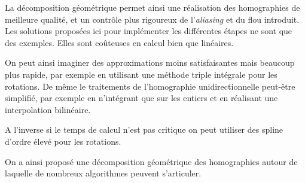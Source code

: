 
La décomposition géométrique permet ainsi une réalisation des homographies de meilleure qualité, et un contrôle plus rigoureux de l'\emph{aliasing} et du flou introduit. Les solutions proposées ici pour implémenter les différentes étapes ne sont que des exemples. Elles sont coûteuses en calcul bien que linéaires. 

On peut ainsi imaginer des approximations moins satisfaisantes mais beaucoup plus rapide, par exemple en utilisant une méthode triple intégrale pour les rotations. De même le traitements de l'homographie unidirectionnelle peut-être simplifié, par exemple en n'intégrant que sur les entiers et en réalisant une interpolation bilinéaire.

A l'inverse si le temps de calcul n'est pas critique on peut utiliser des spline d'ordre élevé pour les rotations.

On a ainsi proposé une décomposition géométrique des homographies autour de laquelle de nombreux algorithmes peuvent s'articuler.

